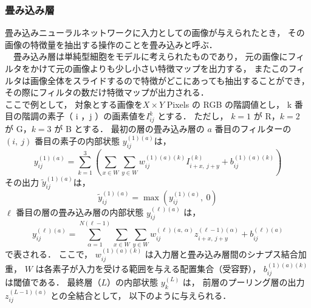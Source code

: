 \subsubsection{畳み込み層}
畳み込みニューラルネットワークに入力としての画像が与えられたとき，
その画像の特徴量を抽出する操作のことを畳み込みと呼ぶ．\\
　畳み込み層は単純型細胞をモデルに考えられたものであり，
元の画像にフィルタをかけて元の画像よりも少し小さい特徴マップを出力する，
またこのフィルタは画像全体をスライドするので特徴がどこにあっても抽出することができ，
その際にフィルタの数だけ特徴マップが出力される．\\
ここで例として，
対象とする画像を$X × Y$ Pixels の RGB の階調値とし，
k 番目の階調の素子（ i ，j ）の画素値を$I^{k}_{ij}$ とする．
ただし，
$k = 1$ が R，$k = 2$ が G，$k = 3$ が B とする．
最初の層の畳み込み層の $a$ 番目のフィルターの$(i,\ j)$ 番目の素子の内部状態
$y^{(1)(a)}_{ij}$は，
\begin{equation}
  y^{(1) (a)}_{ij} = \sum_{k=1}^3
  \left(\sum_{x \in W} \sum_{y \in W}
         w^{(1)(a)(k)}_{ij} I^{(k)}_{i + x,\ j + y}  + b^{(1)(a)(k)}_{ij}
         \right)
  \label{eq:convolution1st}
\end{equation}
その出力
$\tilde{y}_{ij}^{(1)(a)}$は，
\begin{equation}
  \tilde{y}_{ij}^{(1)(a)} = \max \left(y^{(1) (a)}_{ij},\ 0 \right)
  \label{eq:OutputConvolution}
\end{equation}
$\ell$ 番目の層の畳み込み層の内部状態
$y^{(\ell)(a)}_{ij}$ は，
\begin{equation}
  y^{(\ell) (a)}_{ij} = \sum_{\alpha=1}^{N(\ell - 1)} \sum_{x \in W} \sum_{y \in W}
     w^{(\ell)(a,\ \alpha)}_{ij} z^{(\ell - 1)(\alpha)}_{i + x,\ j + y}
         + b^{(\ell)(a)}_{ij}
  \label{eq:convolutionLth}
\end{equation}
で表される．
ここで，
$w^{(1)(a)(k)}_{ij}$ は入力層と畳み込み層間のシナプス結合加重，
$W$ は各素子が入力を受ける範囲を与える配置集合（受容野），
$b^{(1)(a)(k)}_{ij}$ は閾値である．
最終層（$L$）の内部状態 $y^{(L)}_{k}$ は，
前層のプーリング層の出力 $z^{(L - 1)(a)}_{ij}$ との全結合として，
以下のように与えられる．
